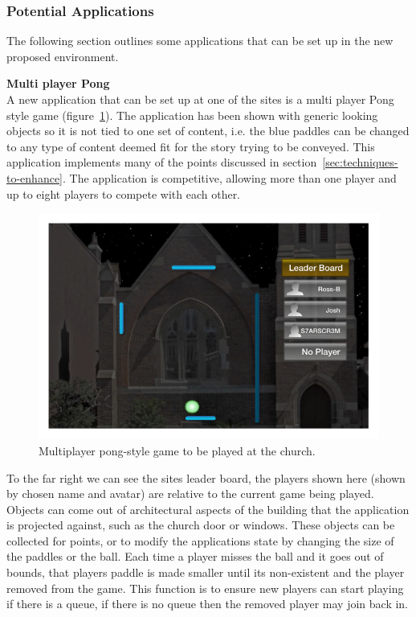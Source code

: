\documentclass[a4paper,12pt]{article}
\begin{document}
\subsubsection{Potential Applications}
The following section outlines some applications that can be set up in the new proposed environment.

\par\textbf{Multi player Pong}\\
A new application that can be set up at one of the sites is a multi player Pong style game (figure~\ref{application-multiPlyerPong}). 
The application has been shown with generic looking objects so it is not tied to one set of content, i.e. the blue paddles can be changed to any type of content deemed fit for the story trying to be conveyed.
This application implements many of the points discussed in section~\ref{sec:techniques-to-enhance}. 
The application is competitive, allowing more than one player and up to eight players to compete with each other.

\begin{figure}[ht!]
	\centering
	\includegraphics[width=125mm]{./images/MultiPlayerChurchGame}
	\caption{Multiplayer pong-style game to be played at the church.}
	\label{application-multiPlyerPong}
\end{figure}

To the far right we can see the sites leader board, the players shown here (shown by chosen name and avatar) are relative to the current game being played. 
Objects can come out of architectural aspects of the building that the application is projected against, such as the church door or windows.
These objects can be collected for points, or to modify the applications state by changing the size of the paddles or the ball.
Each time a player misses the ball and it goes out of bounds, that players paddle is made smaller until its non-existent and the player removed from the game. This function is to ensure new players can start playing if there is a queue, if there is no queue then the removed player may join back in.
\end{document}
